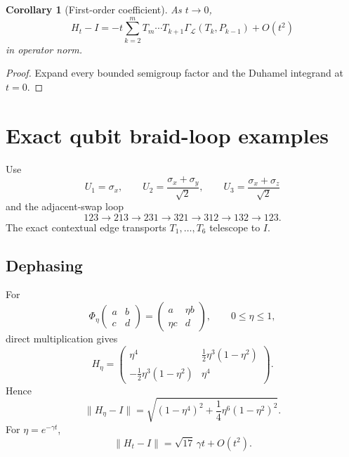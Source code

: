 \documentclass[11pt]{article}
\newtheorem{corollary}[theorem]{Corollary}
\theoremstyle{definition}
\theoremstyle{remark}
\begin{document}
\begin{corollary}[First-order coefficient]\label{cor:first-order}
As $t\to0$,
\begin{equation}\label{eq:first-order}
H_t-I=-t\sum_{k=2}^{m}T_m\cdots T_{k+1}
\Gamma_{\mathcal L}(T_k,P_{k-1})+O(t^2)
\end{equation}
in operator norm.
\end{corollary}
\begin{proof}
Expand every bounded semigroup factor and the Duhamel integrand at $t=0$.
\end{proof}

\section{Exact qubit braid-loop examples}
Use
\[
U_1=\sigma_x,\qquad
U_2=\frac{\sigma_x+\sigma_y}{\sqrt2},\qquad
U_3=\frac{\sigma_x+\sigma_z}{\sqrt2}
\]
and the adjacent-swap loop
\[
123\to213\to231\to321\to312\to132\to123.
\]
The exact contextual edge transports $T_1,\dots,T_6$ telescope to $I$.

\subsection{Dephasing}
For
\[
\Phi_\eta\!\begin{pmatrix}a&b\\c&d\end{pmatrix}
=\begin{pmatrix}a&\eta b\\ \eta c&d\end{pmatrix},\qquad 0\le\eta\le1,
\]
direct multiplication gives
\begin{equation}\label{eq:dephasing-H}
H_\eta=
\begin{pmatrix}
\eta^4&\frac12\eta^3(1-\eta^2)\\
-\frac12\eta^3(1-\eta^2)&\eta^4
\end{pmatrix}.
\end{equation}
Hence
\begin{equation}\label{eq:dephasing-norm}
\|H_\eta-I\|
=\sqrt{(1-\eta^4)^2+\frac14\eta^6(1-\eta^2)^2}.
\end{equation}
For $\eta=e^{-\gamma t}$,
\begin{equation}\label{eq:dephasing-linear}
\|H_t-I\|=\sqrt{17}\,\gamma t+O(t^2).
\end{equation}
\end{document}
